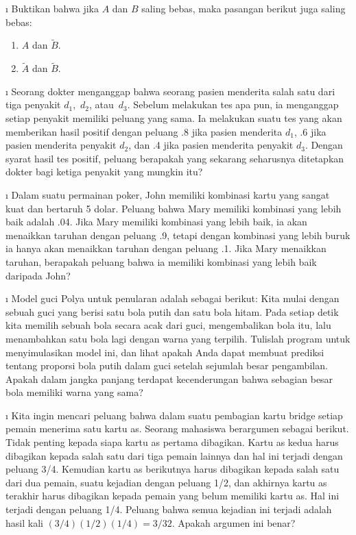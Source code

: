 \begin{LJSItem}
\i\label{exer 4.1.15} Buktikan bahwa jika $A$ dan $B$ saling bebas, maka pasangan berikut juga saling bebas:
\begin{enumerate}
\item $A$ dan $\tilde B$.

\item $\tilde A$ dan $\tilde B$.
\end{enumerate}

\i\label{exer 4.1.16} Seorang dokter menganggap bahwa seorang pasien menderita salah satu dari tiga penyakit $d_1$,~$d_2$,
atau~$d_3$.  Sebelum melakukan tes apa pun, ia menganggap setiap penyakit memiliki peluang yang sama. 
Ia melakukan suatu tes yang akan memberikan hasil positif dengan peluang .8 jika pasien
menderita $d_1$, .6 jika pasien menderita penyakit $d_2$, dan .4 jika pasien menderita penyakit $d_3$.  Dengan syarat
hasil tes positif, peluang berapakah yang sekarang seharusnya ditetapkan dokter
bagi ketiga penyakit yang mungkin itu?

\i\label{exer 4.1.17} Dalam suatu permainan poker, John memiliki kombinasi kartu yang sangat kuat dan bertaruh 5 dolar.  Peluang
bahwa Mary memiliki kombinasi yang lebih baik adalah .04.  Jika Mary memiliki kombinasi yang lebih baik, ia
akan menaikkan taruhan dengan peluang .9, tetapi dengan kombinasi yang lebih buruk ia hanya akan menaikkan taruhan
dengan peluang .1.  Jika Mary menaikkan taruhan, berapakah peluang bahwa ia memiliki
kombinasi yang lebih baik daripada John?

\i\label{exer 4.1.18} Model guci Polya untuk penularan adalah sebagai berikut: Kita
mulai dengan sebuah guci yang berisi satu bola putih dan satu bola hitam.  Pada setiap
detik kita memilih sebuah bola secara acak dari guci, mengembalikan bola itu, lalu menambahkan satu bola lagi
dengan warna yang terpilih.  Tulislah program untuk menyimulasikan model ini, dan lihat apakah
Anda dapat membuat prediksi tentang proporsi bola putih dalam guci
setelah sejumlah besar pengambilan.  Apakah dalam jangka panjang terdapat kecenderungan bahwa sebagian besar
bola memiliki warna yang sama?

\i\label{exer 4.1.19} Kita ingin mencari peluang bahwa dalam suatu pembagian kartu bridge setiap pemain
menerima satu kartu as.  Seorang mahasiswa berargumen sebagai berikut.  Tidak penting kepada siapa
kartu as pertama dibagikan.  Kartu as kedua harus dibagikan kepada salah satu dari tiga pemain lainnya dan
hal ini terjadi dengan peluang 3/4.  Kemudian kartu as berikutnya harus dibagikan kepada salah satu dari dua pemain, suatu
kejadian dengan peluang 1/2, dan akhirnya kartu as terakhir harus dibagikan kepada pemain yang
belum memiliki kartu as.  Hal ini terjadi dengan peluang 1/4.  Peluang bahwa
semua kejadian ini terjadi adalah hasil kali $(3/4)(1/2)(1/4) = 3/32$.  Apakah
argumen ini benar?


\end{LJSItem}
